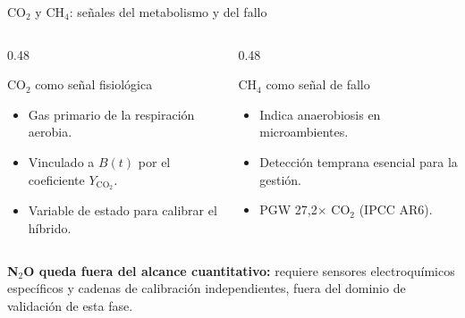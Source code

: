 \documentclass[aspectratio=169, 11pt]{beamer}
\begin{document}
\begin{frame}{CO$_2$ y CH$_4$: se\~{n}ales del metabolismo y del fallo}
    \begin{columns}[T]
        \begin{column}{0.48\textwidth}
            \begin{block}{CO$_2$ como se\~{n}al fisiol\'{o}gica}
                \begin{itemize}
                    \item Gas primario de la respiraci\'{o}n aerobia.
                    \item Vinculado a $B(t)$ por el coeficiente $Y_{\text{CO}_2}$.
                    \item Variable de estado para calibrar el h\'{i}brido.
                \end{itemize}
            \end{block}
        \end{column}
        \begin{column}{0.48\textwidth}
            \begin{alertblock}{CH$_4$ como se\~{n}al de fallo}
                \begin{itemize}
                    \item Indica anaerobiosis en microambientes.
                    \item Detecci\'{o}n temprana esencial para la gesti\'{o}n.
                    \item PGW 27,2$\times$ CO$_2$ (IPCC AR6).
                \end{itemize}
            \end{alertblock}
        \end{column}
    \end{columns}

    \vfill
    \begin{center}
        \textbf{N$_2$O queda fuera del alcance cuantitativo:} requiere sensores electroqu\'{i}micos espec\'{i}ficos y cadenas de calibraci\'{o}n independientes, fuera del dominio de validaci\'{o}n de esta fase.
    \end{center}
\end{frame}
\end{document}
